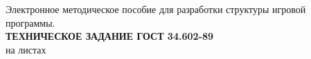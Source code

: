 \documentclass[a4paper, 14pt]{extreport}
\begin{document}
    \begin{titlepage}
        \clearpage
        \vspace*{\fill}
        \begin{center}
            \large
            \begin{minipage}{\textwidth}
                \centering
                Электронное методическое пособие для разработки структуры игровой программы.\\
                \textbf{ТЕХНИЧЕСКОЕ ЗАДАНИЕ ГОСТ 34.602-89}\\
                на \pageref{LastPage} листах
            \end{minipage}
        \end{center}
        \vfill
        \clearpage
    \end{titlepage}
    \tableofcontents
    \newpage
    
\end{document}
